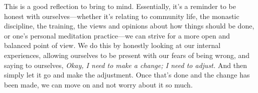 This is a good reflection to bring to mind. Essentially, it's a 
reminder to be honest with ourselves---whether it's relating to 
community life, the monastic discipline, the training, the views and 
opinions about how things should be done, or one's personal meditation 
practice---we can strive for a more open and balanced point of view. We 
do this by honestly looking at our internal experiences, allowing 
ourselves to be present with our fears of being wrong, and saying to 
ourselves, \emph{Okay, I need to make a change; I need to adjust.} And 
then simply let it go and make the adjustment. Once that's done and the 
change has been made, we can move on and not worry about it so much.

